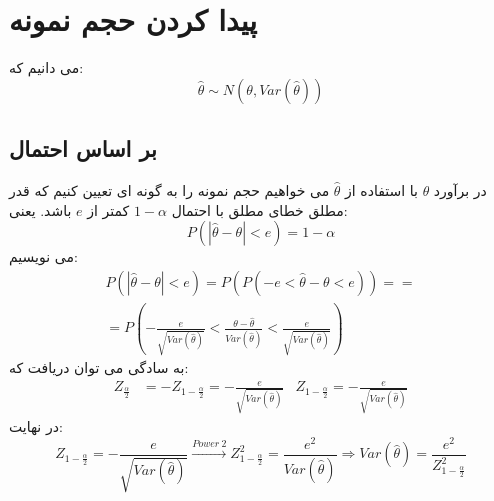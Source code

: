 \section*{پیدا کردن حجم نمونه}
می دانیم که:
\begin{equation*}
	\hat{\theta}\sim N(\theta,Var(\hat{\theta}))
\end{equation*}
\subsection*{بر اساس احتمال}
در برآورد 
$\theta$
با استفاده از 
$\hat{\theta}$
می خواهیم حجم نمونه را به گونه ای تعیین کنیم که قدر مطلق خطای مطلق با احتمال
$1-\alpha$
کمتر از 
$e$
باشد.
یعنی:
\begin{equation*}
	P(|\hat{\theta}-\theta|<e)=1-\alpha
\end{equation*}
می نویسیم:
\begin{multline*}
	P(|\hat{\theta}-\theta|<e)=P(P(-e<\hat{\theta}-\theta<e))=
	=\\=
	P(-\frac{e}{\sqrt{Var(\hat{\theta})}}
	<\frac{\theta-\hat{\theta}}{Var(\hat{\theta})}<
	\frac{e}{\sqrt{Var(\hat{\theta})}})
\end{multline*}
به سادگی می توان دریافت که:
\begin{align*}
	Z_{\frac{\alpha}{2}}&=-Z_{1-\frac{\alpha}{2}}=-\frac{e}{\sqrt{Var(\hat{\theta})}}
	&
	Z_{1-\frac{\alpha}{2}}=-\frac{e}{\sqrt{Var(\hat{\theta})}}
\end{align*}
در نهایت:
\begin{equation*}
	Z_{1-\frac{\alpha}{2}}=-\frac{e}{\sqrt{Var(\hat{\theta})}}
	\overset{Power~2}{\longrightarrow}Z^2_{1-\frac{\alpha}{2}}=\frac{e^2}{Var(\hat{\theta})}
	\Rightarrow Var(\hat{\theta})=\frac{e^2}{Z^2_{1-\frac{\alpha}{2}}}
\end{equation*}
